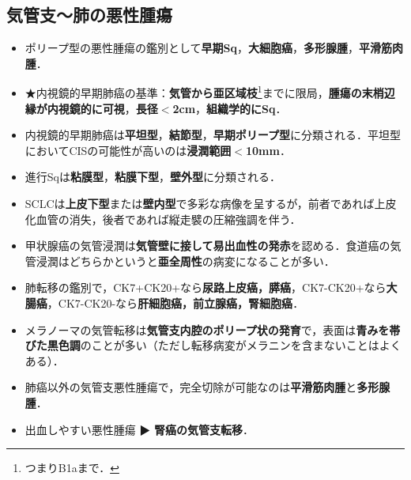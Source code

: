 \subsection{気管支〜肺の悪性腫瘍}

\begin{itemize}

\item ポリープ型の悪性腫瘍の鑑別として\textbf{早期Sq}，\textbf{大細胞癌}，\textbf{多形腺腫}，\textbf{平滑筋肉腫}．

\item ★内視鏡的早期肺癌の基準：\textbf{気管から亜区域枝}\footnote{つまりB1aまで．}までに限局，\textbf{腫瘍の末梢辺縁が内視鏡的に可視}，\textbf{長径$<$2cm}，\textbf{組織学的にSq}．
\item 内視鏡的早期肺癌は\textbf{平坦型}，\textbf{結節型}，\textbf{早期ポリープ型}に分類される．平坦型においてCISの可能性が高いのは\textbf{浸潤範囲$<$10mm}．
\item 進行Sqは\textbf{粘膜型}，\textbf{粘膜下型}，\textbf{壁外型}に分類される．
\item SCLCは\textbf{上皮下型}または\textbf{壁内型}で多彩な病像を呈するが，前者であれば上皮化血管の消失，後者であれば縦走襞の圧縮強調を伴う．


\item 甲状腺癌の気管浸潤は\textbf{気管壁に接して易出血性の発赤}を認める．食道癌の気管浸潤はどちらかというと\textbf{亜全周性}の病変になることが多い．

\item 肺転移の鑑別で，CK7+CK20+なら\textbf{尿路上皮癌，膵癌}，CK7-CK20+なら\textbf{大腸癌}，CK7-CK20-なら\textbf{肝細胞癌，前立腺癌，腎細胞癌}．
\item メラノーマの気管転移は\textbf{気管支内腔のポリープ状の発育}で，表面は\textbf{青みを帯びた黒色調}のことが多い（ただし転移病変がメラニンを含まないことはよくある）．

\item 肺癌以外の気管支悪性腫瘍で，完全切除が可能なのは\textbf{平滑筋肉腫}と\textbf{多形腺腫}．
\item 出血しやすい悪性腫瘍 ▶ \textbf{腎癌の気管支転移}．
\end{itemize}




